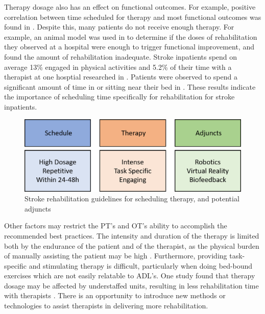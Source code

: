 \documentclass[12pt]{report}
\begin{document}
Therapy dosage also has an effect on functional outcomes. For example, positive correlation between time scheduled for therapy and most functional outcomes was found in \cite{Lohse2014}. Despite this, many patients do not receive enough therapy. For example, an animal model was used in \cite{Lang2009} to determine if the doses of rehabilitation they observed at a hospital were enough to trigger functional improvement, and found the amount of rehabilitation inadequate. Stroke inpatients spend on average 13\% engaged in physical activities and 5.2\% of their time with a therapist at one hosptial researched in \cite{Bernhardt2004}. Patients were observed to spend a significant amount of time in or sitting near their bed in \cite{King2011}. These results indicate the importance of scheduling time specifically for rehabilitation for stroke inpatients. 

	\begin{figure}[h] 
		\centering
		\includegraphics[width=0.75\linewidth]{guidelines}
		\caption{Stroke rehabilitation guidelines for scheduling therapy, and potential adjuncts}
		\label{fig:guidelines}
	\end{figure}

Other factors may restrict the PT's and OT's ability to accomplish the recommended best practices. The intensity and duration of the therapy is limited both by the endurance of the patient and of the therapist, as the physical burden of manually assisting the patient may be high \cite{Colombo}. Furthermore, providing task-specific and stimulating therapy is difficult, particularly when doing bed-bound exercises which are not easily relatable to ADL's. One study found that therapy dosage may be affected by understaffed units, resulting in less rehabilitation time with therapists \cite{Mchugh2013}. There is an opportunity to introduce new methods or technologies to assist therapists in delivering more rehabilitation.
\end{document}
